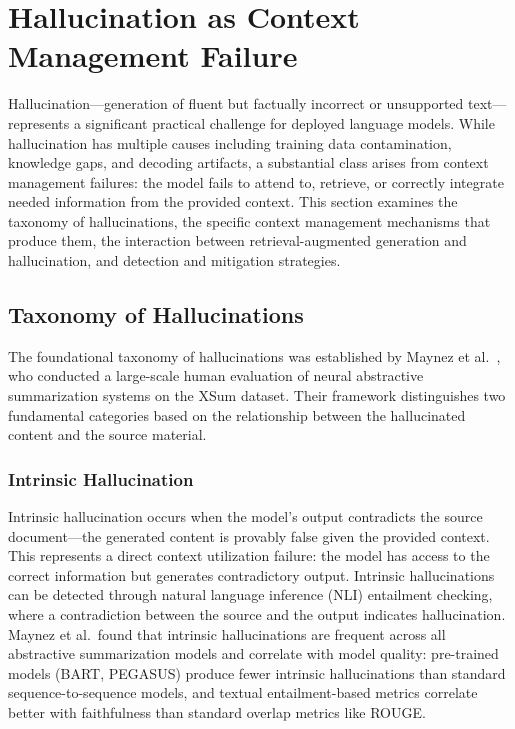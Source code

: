\documentclass[11pt,letterpaper]{article}
\begin{document}
\section{Hallucination as Context Management Failure}
\label{sec:hallucination}

Hallucination---generation of fluent but factually incorrect or unsupported text---represents a significant practical challenge for deployed language models. While hallucination has multiple causes including training data contamination, knowledge gaps, and decoding artifacts, a substantial class arises from context management failures: the model fails to attend to, retrieve, or correctly integrate needed information from the provided context. This section examines the taxonomy of hallucinations, the specific context management mechanisms that produce them, the interaction between retrieval-augmented generation and hallucination, and detection and mitigation strategies.

\subsection{Taxonomy of Hallucinations}

The foundational taxonomy of hallucinations was established by Maynez et al.\ \cite{maynez2020faithfulness}, who conducted a large-scale human evaluation of neural abstractive summarization systems on the XSum dataset. Their framework distinguishes two fundamental categories based on the relationship between the hallucinated content and the source material.

\subsubsection{Intrinsic Hallucination}

Intrinsic hallucination occurs when the model's output contradicts the source document---the generated content is provably false given the provided context. This represents a direct context utilization failure: the model has access to the correct information but generates contradictory output. Intrinsic hallucinations can be detected through natural language inference (NLI) entailment checking, where a contradiction between the source and the output indicates hallucination. Maynez et al.\ found that intrinsic hallucinations are frequent across all abstractive summarization models and correlate with model quality: pre-trained models (BART, PEGASUS) produce fewer intrinsic hallucinations than standard sequence-to-sequence models, and textual entailment-based metrics correlate better with faithfulness than standard overlap metrics like ROUGE.
\end{document}
